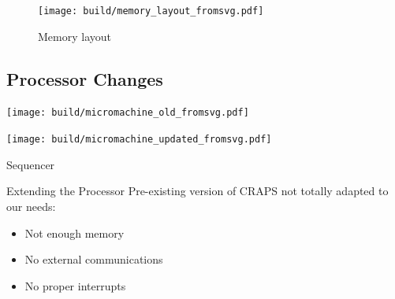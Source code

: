 \documentclass{beamer}
\begin{document}
      \begin{frame}[plain]
        \begin{figure}
          \begin{minipage}[c]{0.5\textwidth}
            \caption{Memory layout}
          \end{minipage}\hfill
          \begin{minipage}[c]{0.5\textwidth}
            \texttt{[image: build/memory\_layout\_fromsvg.pdf]}
          \end{minipage}
        \end{figure}
      \end{frame}

    \subsection{Processor Changes}
      \begin{landscape}
        \begin{frame}[plain]
            \texttt{[image: build/micromachine\_old\_fromsvg.pdf]}

        \end{frame}
        \begin{frame}[plain]
            \texttt{[image: build/micromachine\_updated\_fromsvg.pdf]}

        \end{frame}
      \end{landscape}

      \begin{frame}{Sequencer}
      \end{frame}

      \begin{frame}
      \end{frame}

      \begin{frame}
      \end{frame}

      \begin{frame}{Extending the Processor}
          Pre-existing version of CRAPS not totally adapted to our needs:
          \begin{itemize}
            \item Not enough memory
            \item No external communications
            \item No proper interrupts
          \end{itemize}
      \end{frame}
\end{document}
